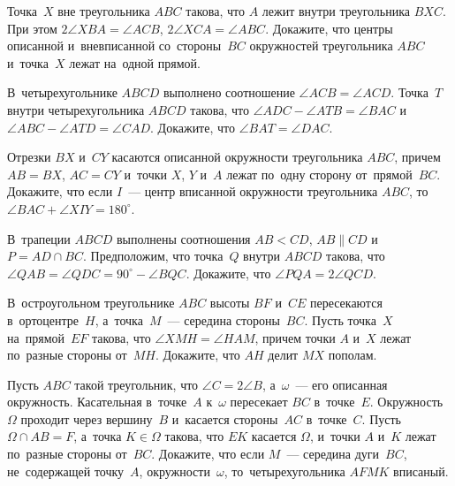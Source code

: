 


\begin{problems}

\item
Точка~$X$ вне треугольника $ABC$ такова, что $A$ лежит внутри
треугольника $BXC$.
При этом $2 \angle XBA = \angle ACB$, $2 \angle XCA = \angle ABC$.
Докажите, что центры описанной и~вневписанной со~стороны~$BC$ окружностей
треугольника $ABC$ и~точка~$X$ лежат на~одной прямой.

\item
В~четырехугольнике $ABCD$ выполнено соотношение $\angle ACB = \angle ACD$.
Точка~$T$ внутри четырехугольника $ABCD$ такова, что
$\angle ADC - \angle ATB = \angle BAC$
и~$\angle ABC - \angle ATD = \angle CAD$.
Докажите, что $\angle BAT = \angle DAC$.

\item
Отрезки $BX$ и~$CY$ касаются описанной окружности треугольника $ABC$, причем
$AB = BX$, $AC = CY$ и~точки $X$, $Y$ и~$A$ лежат по~одну сторону
от~прямой~$BC$.
Докажите, что если $I$~--- центр вписанной окружности треугольника $ABC$,
то~$\angle BAC + \angle XIY = 180^{\circ}$.

\item
В~трапеции $ABCD$ выполнены соотношения $AB < CD$, $AB \parallel CD$
и~$P = AD \cap BC$.
Предположим, что точка~$Q$ внутри $ABCD$ такова, что
$\angle QAB = \angle QDC = 90^{\circ} - \angle BQC$.
Докажите, что $\angle PQA = 2 \angle QCD$.

\item
В~остроугольном треугольнике $ABC$ высоты $BF$ и~$CE$ пересекаются
в~ортоцентре~$H$, а~точка~$M$~--- середина стороны~$BC$.
Пусть точка~$X$ на~прямой~$EF$ такова, что $\angle XMH = \angle HAM$, причем
точки $A$ и~$X$ лежат по~разные стороны от~$MH$.
Докажите, что $AH$ делит $MX$ пополам.

\item
Пусть $ABC$ такой треугольник, что $\angle C = 2 \angle B$, а~$\omega$~--- его
описанная окружность.
Касательная в~точке~$A$ к~$\omega$ пересекает $BC$ в~точке~$E$.
Окружность~$\Omega$ проходит через вершину~$B$ и~касается стороны~$AC$
в~точке~$C$.
Пусть $\Omega \cap AB = F$, а~точка $K \in \Omega$ такова, что $EK$ касается $\Omega$,
и~точки $A$ и~$K$ лежат по~разные стороны от~$BC$.
Докажите, что если $M$~--- середина дуги~$BC$, не~содержащей точку~$A$,
окружности~$\omega$, то~четырехугольника $AFMK$ вписаный.


\end{problems}
